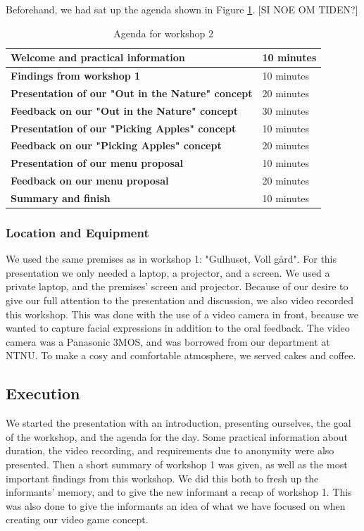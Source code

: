 Beforehand, we had sat up the agenda shown in Figure \ref{tab:agendaW2}. [SI NOE OM TIDEN?]

\begin{table} [ht!]
\centering
    \begin{tabular}{|l|l|}
       \hline
       \textbf{Welcome and practical information} & 10 minutes  \\ \hline
       \textbf{Findings from workshop 1} & 10 minutes \\ \hline
       \textbf{Presentation of our "Out in the Nature" concept} & 20 minutes \\ \hline
	   \textbf{Feedback on our "Out in the Nature" concept} & 30 minutes \\ \hline
	   \textbf{Presentation of our "Picking Apples" concept} & 10 minutes \\ \hline
	   \textbf{Feedback on our "Picking Apples" concept} & 20 minutes \\ \hline
	   \textbf{Presentation of our menu proposal} & 10 minutes \\ \hline
	   \textbf{Feedback on our menu proposal} & 20 minutes \\ \hline
	   \textbf{Summary and finish} & 10 minutes \\ \hline
    \end{tabular}
    \caption[Workshop 2 agenda]{Agenda for workshop 2}
    \label{tab:agendaW2}
\end{table} 


\subsubsection{Location and Equipment}
We used the same premises as in workshop 1: "Gulhuset, Voll gård". 
For this presentation we only needed a laptop, a projector, and a screen. We used a private laptop, and the premises' screen and projector. Because of our desire to give our full attention to the presentation and discussion, we also video recorded this workshop. This was done with the use of a video camera in front, because we wanted to capture facial expressions in addition to the oral feedback. The video camera was a Panasonic 3MOS, and was borrowed from our department at NTNU. To make a cosy and comfortable atmosphere, we served cakes and coffee.   

\subsection{Execution}
We started the presentation with an introduction, presenting ourselves, the goal of the workshop, and the agenda for the day. Some practical information about duration, the video recording, and requirements due to anonymity were also presented. Then a short summary of workshop 1 was given, as well as the most important findings from this workshop. We did this both to fresh up the informants' memory, and to give the new informant a recap of workshop 1. This was also done to give the informants an idea of what we have focused on when creating our video game concept.        

